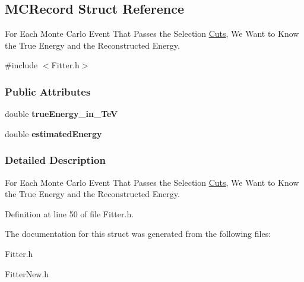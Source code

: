 \hypertarget{structMCRecord}{
\subsection{MCRecord Struct Reference}
\label{structMCRecord}
}


For Each Monte Carlo Event That Passes the Selection \hyperlink{namespaceCuts}{Cuts}, We Want to Know the True Energy and the Reconstructed Energy.  




{\ttfamily \#include $<$Fitter.h$>$}

\subsubsection*{Public Attributes}
\begin{DoxyCompactItemize}
\item 
\hypertarget{structMCRecord_a47c1e228820b8bf3de8c9d959963a504}{
double {\bfseries trueEnergy\_\-in\_\-TeV}}
\label{structMCRecord_a47c1e228820b8bf3de8c9d959963a504}

\item 
\hypertarget{structMCRecord_aef6015e2be171bc4fc42be18a4108ad0}{
double {\bfseries estimatedEnergy}}
\label{structMCRecord_aef6015e2be171bc4fc42be18a4108ad0}

\end{DoxyCompactItemize}


\subsubsection{Detailed Description}
For Each Monte Carlo Event That Passes the Selection \hyperlink{namespaceCuts}{Cuts}, We Want to Know the True Energy and the Reconstructed Energy. 

Definition at line 50 of file Fitter.h.



The documentation for this struct was generated from the following files:\begin{DoxyCompactItemize}
\item 
Fitter.h\item 
FitterNew.h\end{DoxyCompactItemize}
